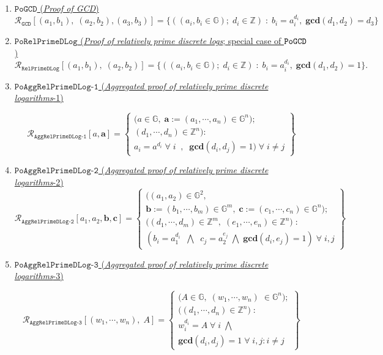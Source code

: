 \documentclass[11pt, lettersize, notitlepage, leqno, footskip=0.6cm]{article}
\newcommand{\bz}{\mathbb Z}
\newcommand{\ttt}{\texttt}
\newcommand{\mc}{\mathcal}
\newcommand{\mb}{\mathbb}
\newcommand{\mbf}{\mathbf}
\newcommand{\vs}{\vspace{-0.15cm}}
\newcommand{\GCD}{\mbf{gcd}}
\numberwithin{equation}{section}
\begin{document}
{{\begin{enumerate}[wide, labelwidth=!, labelindent=0pt]
\item \hyperlink{GCD}{$\ttt{PoGCD}$ (\textit{Proof of GCD})} \vspace{-0.15cm} $$\mc{R}_{{\ttt{GCD}}}[(a_1,b_1),\; (a_2,b_2),(a_3,b_3)] = \{((a_i, b_i\in\mb{G});\;d_i\in\bz)\;:\; b_i = a_i^{d_i},\;\GCD(d_1,d_2)=d_3  \} $$


\item \hyperlink{RP}{$\ttt{PoRelPrimeDLog}$ (\textit{Proof of relatively prime discrete logs}; special case of $\tt{PoGCD}$)} \vs $$ \mc{R}_{\ttt{RelPrimeDLog}}[(a_1,b_1),\;(a_2,b_2)] = \{((a_i, b_i\in\mb{G});\;d_i\in\bz)\;:\; b_i = a_i^{d_i},\;\GCD(d_1,d_2)=1 \} .$$


\item \hyperlink{RP1}{$\ttt{PoAggRelPrimeDLog-1}$ (\textit{Aggregated proof of relatively prime discrete logarithms}-1)} \vspace{-0.2cm}

\[
  \mc{R}_{\ttt{AggRelPrimeDLog-1}}[a, \mbf{a}] = \left\{\begin{array}{l}
    \big(a\in\mb{G},\;  \mbf{a}:=(a_1,\cdots, a_n)\in\mb{G}^n);\\
    (d_1,\cdots,d_n)\in\bz^n\big): \\
    a_i = a^{d_i}\;\forall\;i\;\;,\;\; \GCD(d_i, d_j) = 1)\;\forall \;i\neq j   	
  \end{array}\right\}
\] 

\item \hyperlink{RP2}{$\ttt{PoAggRelPrimeDLog-2}$ (\textit{Aggregated proof of relatively prime discrete logarithms}-2)} \vs \[
  \mc{R}_{{\ttt{AggRelPrimeDLog-2}}}[a_1, a_2, \mbf{b}, \mbf{c}] = \left\{\begin{array}{l}
    \big((a_1,a_2)\in\mb{G}^2,\;\\
     \mbf{b}:=(b_1,\cdots, b_m)\in\mb{G}^m,\;\mbf{c}:= (c_1,\cdots, c_n)\in\mb{G}^n);\\
    ((d_1,\cdots,d_m)\in\bz^m,\; (e_1,\cdots,e_n)\in\bz^n\big)\;: \\
    (b_i = a_1^{d_i}\;\;\bigwedge\;\; c_j = a_2^{e_j}\;\bigwedge\; \GCD(d_i, e_j) = 1)\;\forall \;i,j   	
  \end{array}\right\}
\] 

\item \hyperlink{RP3}{$\ttt{PoAggRelPrimeDLog-3}$ (\textit{Aggregated proof of relatively prime discrete logarithms}-3)} \vspace{-0.2cm}

\[
  \mc{R}_{{\ttt{AggRelPrimeDLog-3}}}[(w_1,\cdots, w_n),\; A] = \left\{\begin{array}{l}
    \big(A\in\mb{G},\; (w_1,\cdots, w_n)\;\in\mb{G}^n);\\
    ((d_1,\cdots,d_n)\in\bz^n\big)\;: \\
    w_i^{d_i} = A\;\forall\;i\;\bigwedge  \\
   	\GCD(d_i, d_j) = 1\;\forall \;i,j: i\neq j
  \end{array}\right\}
\] 


\end{enumerate}}}
\end{document}
